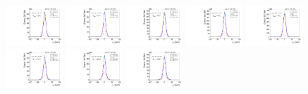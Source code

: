 \begin{figure}[htb]
\includegraphics[width=0.19\textwidth]{plots/Appendix_Recoil_Fits/WmmMC_PF_13TeV_2G/pfu2fit_24.pdf}
\includegraphics[width=0.19\textwidth]{plots/Appendix_Recoil_Fits/WmmMC_PF_13TeV_2G/pfu2fit_25.pdf}
\includegraphics[width=0.19\textwidth]{plots/Appendix_Recoil_Fits/WmmMC_PF_13TeV_2G/pfu2fit_26.pdf}
\includegraphics[width=0.19\textwidth]{plots/Appendix_Recoil_Fits/WmmMC_PF_13TeV_2G/pfu2fit_27.pdf}
\includegraphics[width=0.19\textwidth]{plots/Appendix_Recoil_Fits/WmmMC_PF_13TeV_2G/pfu2fit_28.pdf}
\includegraphics[width=0.19\textwidth]{plots/Appendix_Recoil_Fits/WmmMC_PF_13TeV_2G/pfu2fit_29.pdf}
\includegraphics[width=0.19\textwidth]{plots/Appendix_Recoil_Fits/WmmMC_PF_13TeV_2G/pfu2fit_30.pdf}
\includegraphics[width=0.19\textwidth]{plots/Appendix_Recoil_Fits/WmmMC_PF_13TeV_2G/pfu2fit_31.pdf}

\end{figure}
